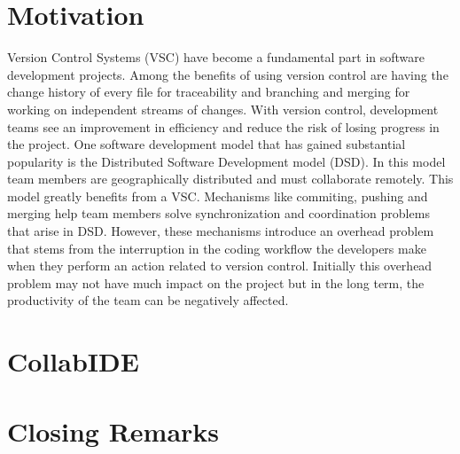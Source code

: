\documentclass[10pt, conference, draft]{IEEEtran}
\begin{document}
\IEEEpeerreviewmaketitle


\section{Motivation}
\label{sec:motivation}

Version Control Systems (VSC) have become a fundamental part in software development projects. Among the benefits of using version control are having the change history of every file for traceability and branching and merging for working on independent streams of changes. With version control, development teams see an improvement in efficiency and reduce the risk of losing progress in the project.
One software development model that has gained substantial popularity is the Distributed Software Development model (DSD). In this model team members are geographically distributed and must collaborate remotely. This model greatly benefits from a VSC. Mechanisms like commiting, pushing and merging help team members solve synchronization and coordination problems that arise in DSD. However, these mechanisms introduce an overhead problem that stems from the interruption in the coding workflow the developers make when they perform an action related to version control. Initially this overhead problem may not have much impact on the project but in the long term, the productivity of the team can be negatively affected.

\section{CollabIDE}
\label{sec:collab-ide}


\section{Closing Remarks}
\label{sec:conclusion}





%


  
\end{document}
